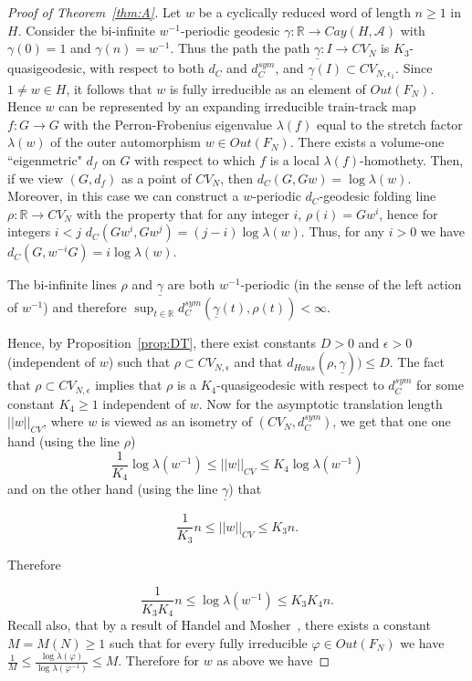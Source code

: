 \documentclass[11pt,letterpaper]{amsart}
\theoremstyle{definition}
\theoremstyle{remark}
\renewcommand{\phi}{\varphi}
\begin{document}
\begin{proof}[Proof of Theorem~\ref{thm:A}]
 Let $w$ be a cyclically reduced word of length $n\ge 1$ in $H$. Consider the bi-infinite $w^{-1}$-periodic geodesic $\gamma:\mathbb R\to Cay(H,\mathcal A)$ with $\gamma(0)=1$ and $\gamma(n)=w^{-1}$.   Thus the path the path $\underline{\gamma}:I\to CV_N$ is $K_3$-quasigeodesic, with respect to both $d_C$ and $d_C^{sym}$,  and $\underline{\gamma}(I)\subset CV_{N,\epsilon_1}$. Since $1\ne w\in H$, it follows that $w$ is fully irreducible as an element of $Out(F_N)$. Hence $w$ can be represented by an expanding irreducible train-track map $f:G\to G$ with the Perron-Frobenius eigenvalue $\lambda(f)$ equal to the stretch factor $\lambda(w)$ of the outer automorphism $w\in Out(F_N)$. There exists a volume-one ``eigenmetric" $d_f$ on $G$ with respect to which $f$ is a local $\lambda(f)$-homothety.  Then, if we view $(G,d_f)$ as a point of $CV_N$, then $d_C(G,Gw)=\log\lambda(w)$.  Moreover, in this case we can construct a $w$-periodic $d_C$-geodesic folding line $\rho:\mathbb R\to CV_N$ with the property that for any integer $i$, $\rho(i)=Gw^i$, hence for integers $i<j$ $d_C(Gw^i,Gw^j)=(j-i)\log\lambda(w)$. Thus, for any $i>0$ we have $d_C(G, w^{-i}G)=i\log\lambda(w)$.

The bi-infinite lines $\rho$ and $\underline{\gamma}$ are both $w^{-1}$-periodic (in the sense of the left action of $w^{-1}$) and therefore $\sup_{t\in \mathbb R} d_C^{sym}(\underline\gamma(t),\rho(t))<\infty$.

Hence, by Proposition~\ref{prop:DT}, there exist constants $D>0$ and $\epsilon>0$ (independent of $w$) such that $\rho\subset CV_{N,\epsilon}$ and that $d_{Haus}(\rho,\underline\gamma))\le D$.  The fact that $\rho\subset CV_{N,\epsilon}$ implies that $\rho$ is a $K_4$-quasigeodesic with respect to $d_C^{sym}$ for some constant $K_4\ge 1$ independent of $w$. Now for the asymptotic translation length $||w||_{CV}$, where $w$ is viewed as an isometry of $(CV_N, d_C^{sym})$, we get that one one hand (using the line $\rho$)
\[
\frac{1}{K_4}\log\lambda(w^{-1})\le ||w||_{CV} \le K_4 \log \lambda(w^{-1})
\]
and on the other hand (using the line $\underline\gamma$) that

\[
\frac{1}{K_3}n\le ||w||_{CV} \le K_3 n.
\]

Therefore

\[
\frac{1}{K_3K_4}n\le \log\lambda(w^{-1}) \le K_3K_4n.
\]
Recall also, that by a result of Handel and Mosher~\cite{HM}, there exists a constant $M=M(N)\ge 1$ such that for every fully irreducible $\phi\in Out(F_N)$ we have $\frac{1}{M}\le \frac{\log\lambda(\phi)}{\log\lambda(\phi^{-1})}\le M$.
Therefore for $w$ as above we have 



\end{proof}
\end{document}
